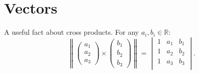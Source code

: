 \documentclass[oneside]{book}
\begin{document}
\chapter{Vectors}
\begin{note}
  A useful fact about cross products. For any \(a_i,b_i\in \mathbb{R}\):
  \[\left\lVert 
    \begin{pmatrix}
      a_1\\
      a_2\\
      a_3
    \end{pmatrix}\times
    \begin{pmatrix}
      b_1\\
      b_2\\
      b_3
    \end{pmatrix}
   \right\rVert=
  \begin{vmatrix}
    1 & a_1 & b_1\\
    1 & a_2 & b_2\\
    1 & a_3 & b_3\\
  \end{vmatrix}.\]
\end{note}
\end{document}
